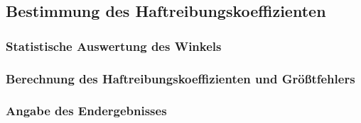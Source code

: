 \subsection{Bestimmung des Haftreibungskoeffizienten}

\subsubsection{Statistische Auswertung des Winkels}

\subsubsection{Berechnung des Haftreibungskoeffizienten und Größtfehlers}

\subsubsection{Angabe des Endergebnisses}